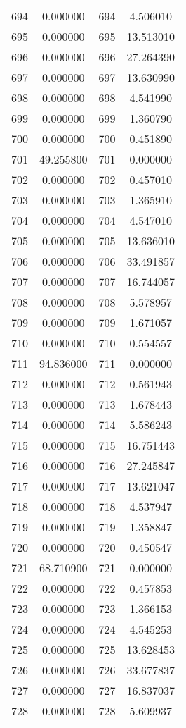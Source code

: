 \documentclass[12pt]{article}
\begin{document}
\begin{longtable}{@{}cccc@{}}
694 & 0.000000 & 694 & 4.506010 \\
695 & 0.000000 & 695 & 13.513010 \\
696 & 0.000000 & 696 & 27.264390 \\
697 & 0.000000 & 697 & 13.630990 \\
698 & 0.000000 & 698 & 4.541990 \\
699 & 0.000000 & 699 & 1.360790 \\
700 & 0.000000 & 700 & 0.451890 \\
701 & 49.255800 & 701 & 0.000000 \\
702 & 0.000000 & 702 & 0.457010 \\
703 & 0.000000 & 703 & 1.365910 \\
704 & 0.000000 & 704 & 4.547010 \\
705 & 0.000000 & 705 & 13.636010 \\
706 & 0.000000 & 706 & 33.491857 \\
707 & 0.000000 & 707 & 16.744057 \\
708 & 0.000000 & 708 & 5.578957 \\
709 & 0.000000 & 709 & 1.671057 \\
710 & 0.000000 & 710 & 0.554557 \\
711 & 94.836000 & 711 & 0.000000 \\
712 & 0.000000 & 712 & 0.561943 \\
713 & 0.000000 & 713 & 1.678443 \\
714 & 0.000000 & 714 & 5.586243 \\
715 & 0.000000 & 715 & 16.751443 \\
716 & 0.000000 & 716 & 27.245847 \\
717 & 0.000000 & 717 & 13.621047 \\
718 & 0.000000 & 718 & 4.537947 \\
719 & 0.000000 & 719 & 1.358847 \\
720 & 0.000000 & 720 & 0.450547 \\
721 & 68.710900 & 721 & 0.000000 \\
722 & 0.000000 & 722 & 0.457853 \\
723 & 0.000000 & 723 & 1.366153 \\
724 & 0.000000 & 724 & 4.545253 \\
725 & 0.000000 & 725 & 13.628453 \\
726 & 0.000000 & 726 & 33.677837 \\
727 & 0.000000 & 727 & 16.837037 \\
728 & 0.000000 & 728 & 5.609937 \\

\end{longtable}
\end{document}
